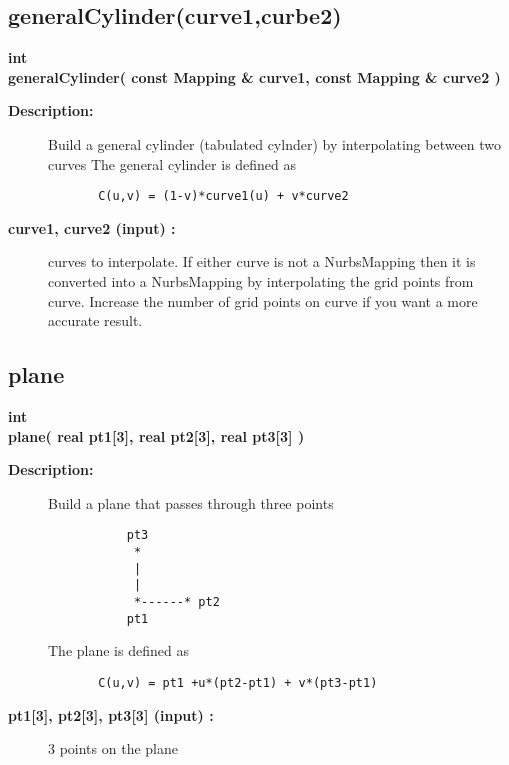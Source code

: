 \subsection{generalCylinder(curve1,curbe2)}
 
\begin{flushleft} \textbf{%
int  \\ 
\settowidth{\NurbsMappingIncludeArgIndent}{generalCylinder(}%
generalCylinder( const Mapping \& curve1, const Mapping \& curve2 )
}\end{flushleft}
\begin{description}
\item[{\bf Description:}] 
    Build a general cylinder (tabulated cylnder) by interpolating between two curves
    The general cylinder is defined as
 \begin{verbatim}
       C(u,v) = (1-v)*curve1(u) + v*curve2
 \end{verbatim}

\item[{\bf curve1, curve2 (input) :}]  curves to interpolate. If either curve is not a NurbsMapping then it is converted into
   a NurbsMapping by interpolating the grid points from curve. Increase the number of grid points
      on curve if you want a more accurate result.

\end{description}
\subsection{plane}
 
\begin{flushleft} \textbf{%
int  \\ 
\settowidth{\NurbsMappingIncludeArgIndent}{plane(}%
plane( real pt1[3], real pt2[3], real pt3[3] )
}\end{flushleft}
\begin{description}
\item[{\bf Description:}] 
    Build a plane that passes through three points
              
 \begin{verbatim}
           pt3
            * 
            |
            |
            *------* pt2
           pt1
 \end{verbatim}
 
    The plane is defined as 
 \begin{verbatim}
       C(u,v) = pt1 +u*(pt2-pt1) + v*(pt3-pt1)
 \end{verbatim}

\item[{\bf pt1[3], pt2[3], pt3[3] (input) :}]  3 points on the plane

\end{description}
